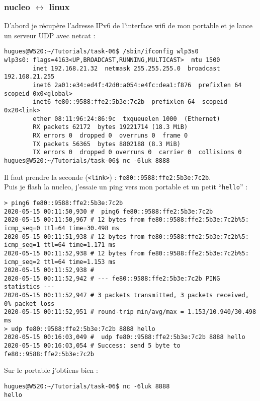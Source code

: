 \subsubsection{nucleo $\leftrightarrow$ linux}
D'abord je récupère l'adresse IPv6 de l'interface wifi de mon portable 
et je lance un serveur UDP avec netcat :
{\scriptsize
\begin{verbatim}
hugues@W520:~/Tutorials/task-06$ /sbin/ifconfig wlp3s0
wlp3s0: flags=4163<UP,BROADCAST,RUNNING,MULTICAST>  mtu 1500
        inet 192.168.21.32  netmask 255.255.255.0  broadcast 192.168.21.255
        inet6 2a01:e34:ed4f:42d0:a054:e4fc:dea1:f876  prefixlen 64  scopeid 0x0<global>
        inet6 fe80::9588:ffe2:5b3e:7c2b  prefixlen 64  scopeid 0x20<link>
        ether 08:11:96:24:86:9c  txqueuelen 1000  (Ethernet)
        RX packets 62172  bytes 19221714 (18.3 MiB)
        RX errors 0  dropped 0  overruns 0  frame 0
        TX packets 56365  bytes 8802188 (8.3 MiB)
        TX errors 0  dropped 0 overruns 0  carrier 0  collisions 0
hugues@W520:~/Tutorials/task-06$ nc -6luk 8888
\end{verbatim}
}
Il faut prendre la seconde (\texttt{<link>}) : 
\texttt{fe80::9588:ffe2:5b3e:7c2b}.\\

Puis je flash la nucleo, j'essaie un ping vers mon portable et un petit
\enquote{\texttt{hello}} :
{\scriptsize
\begin{verbatim}
> ping6 fe80::9588:ffe2:5b3e:7c2b
2020-05-15 00:11:50,930 #  ping6 fe80::9588:ffe2:5b3e:7c2b
2020-05-15 00:11:50,967 # 12 bytes from fe80::9588:ffe2:5b3e:7c2b%5: icmp_seq=0 ttl=64 time=30.498 ms
2020-05-15 00:11:51,938 # 12 bytes from fe80::9588:ffe2:5b3e:7c2b%5: icmp_seq=1 ttl=64 time=1.171 ms
2020-05-15 00:11:52,938 # 12 bytes from fe80::9588:ffe2:5b3e:7c2b%5: icmp_seq=2 ttl=64 time=1.153 ms
2020-05-15 00:11:52,938 # 
2020-05-15 00:11:52,942 # --- fe80::9588:ffe2:5b3e:7c2b PING statistics ---
2020-05-15 00:11:52,947 # 3 packets transmitted, 3 packets received, 0% packet loss
2020-05-15 00:11:52,951 # round-trip min/avg/max = 1.153/10.940/30.498 ms
> udp fe80::9588:ffe2:5b3e:7c2b 8888 hello
2020-05-15 00:16:03,049 #  udp fe80::9588:ffe2:5b3e:7c2b 8888 hello
2020-05-15 00:16:03,054 # Success: send 5 byte to fe80::9588:ffe2:5b3e:7c2b
\end{verbatim}
}
Sur le portable j'obtiens bien :
\begin{verbatim}
hugues@W520:~/Tutorials/task-06$ nc -6luk 8888
hello
\end{verbatim}
